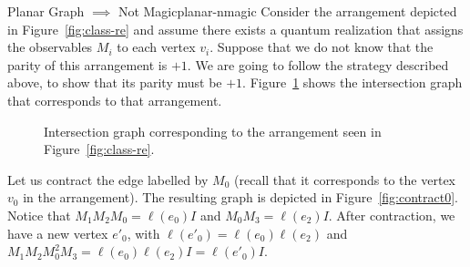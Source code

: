 \documentclass{llncs}
\begin{document}
\begin{tcbexample}{Planar Graph \(\implies\) Not Magic}{planar-nmagic}
  Consider the arrangement depicted in Figure~\ref{fig:class-re} and
  assume there exists a quantum realization that assigns the
  observables \(M_{i}\) to each vertex \(v_{i}\). Suppose that we do
  not know that the parity of this arrangement is \(+1\). We are going
  to follow the strategy described above, to show that its parity must
  be \(+1\). Figure~\ref{fig:class-re-inters} shows the intersection graph
  that corresponds to that arrangement.

  \begin{figure}[H]
    \begin{center}
    \end{center}
    \caption{Intersection graph corresponding to the arrangement seen
      in Figure~\ref{fig:class-re}.\label{fig:class-re-inters}}
  \end{figure}

  Let us contract the edge labelled by \(M_{0}\) (recall that it
  corresponds to the vertex \(v_{0}\) in the arrangement). The
  resulting graph is depicted in Figure~\ref{fig:contract0}.  Notice
  that \(M_{1}M_{2}M_{0} = \ell(e_{0}) I\) and
  \(M_{0}M_{3} = \ell(e_{2}) I\). After contraction, we have
  a new vertex \(e'_{0}\), with \(\ell(e'_{0}) = \ell(e_{0})\ell(e_{2})\)
  and \(M_{1}M_{2}M_{0}^{2}M_{3} = \ell(e_{0})\ell(e_{2}) I = \ell(e'_{0}) I\).


\end{tcbexample}
\end{document}
